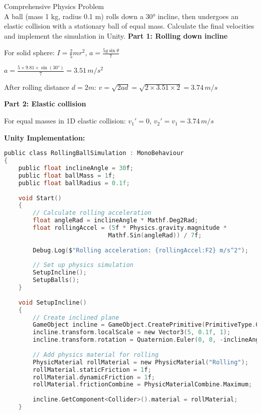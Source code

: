 \begin{example2}{Comprehensive Physics Problem}\\
    A ball (mass 1 kg, radius 0.1 m) rolls down a 30° incline, then undergoes an elastic collision with a stationary ball of equal mass. Calculate the final velocities and implement the simulation in Unity.
    \tcblower
    \textbf{Part 1: Rolling down incline}
    
    For solid sphere: $I = \frac{2}{5}mr^2$, $a = \frac{5g\sin\theta}{7}$
    
    $a = \frac{5 \times 9.81 \times \sin(30°)}{7} = 3.51 \, m/s^2$
    
    After rolling distance $d = 2m$: $v = \sqrt{2ad} = \sqrt{2 \times 3.51 \times 2} = 3.74 \, m/s$
    
    \textbf{Part 2: Elastic collision}
    
    For equal masses in 1D elastic collision:
    $v_1' = 0$, $v_2' = v_1 = 3.74 \, m/s$
    
    \textbf{Unity Implementation:}
\begin{lstlisting}[language=C, style=basesmol]
public class RollingBallSimulation : MonoBehaviour 
{
    public float inclineAngle = 30f;
    public float ballMass = 1f;
    public float ballRadius = 0.1f;
    
    void Start() 
    {
        // Calculate rolling acceleration
        float angleRad = inclineAngle * Mathf.Deg2Rad;
        float rollingAccel = (5f * Physics.gravity.magnitude * 
                             Mathf.Sin(angleRad)) / 7f;
        
        Debug.Log($"Rolling acceleration: {rollingAccel:F2} m/s^2");
        
        // Set up physics simulation
        SetupIncline();
        SetupBalls();
    }
    
    void SetupIncline() 
    {
        // Create inclined plane
        GameObject incline = GameObject.CreatePrimitive(PrimitiveType.Cube);
        incline.transform.localScale = new Vector3(5, 0.1f, 1);
        incline.transform.rotation = Quaternion.Euler(0, 0, -inclineAngle);
        
        // Add physics material for rolling
        PhysicMaterial rollMaterial = new PhysicMaterial("Rolling");
        rollMaterial.staticFriction = 1f;
        rollMaterial.dynamicFriction = 1f;
        rollMaterial.frictionCombine = PhysicMaterialCombine.Maximum;
        
        incline.GetComponent<Collider>().material = rollMaterial;
    }
    

\end{lstlisting}
\end{example2}
